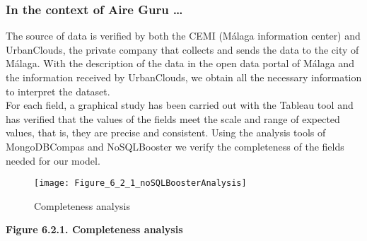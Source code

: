 \subsubsection*{In the context of Aire Guru \ldots} 

The source of data is verified by both the CEMI (Málaga information center) and UrbanClouds, the private company
that collects and sends the data to the city of Málaga. With the description of the data in the open data portal of Málaga and the information received by UrbanClouds,
we obtain all the necessary information to interpret the dataset. \\

For each field, a graphical study has been carried out with the Tableau tool and has verified that the values of the
fields meet the scale and range of expected values, that is, they are precise and consistent.
Using the analysis tools of MongoDBCompas and NoSQLBooster we verify the completeness of the fields needed for our model.

\begin{figure}[ht]
    \centering
    \texttt{[image: Figure\_6\_2\_1\_noSQLBoosterAnalysis]}
    \caption{Completeness analysis}
\end{figure}

\begin{center}
    \bf{ 
    Figure 6.2.1. Completeness analysis}
  \end{center} 